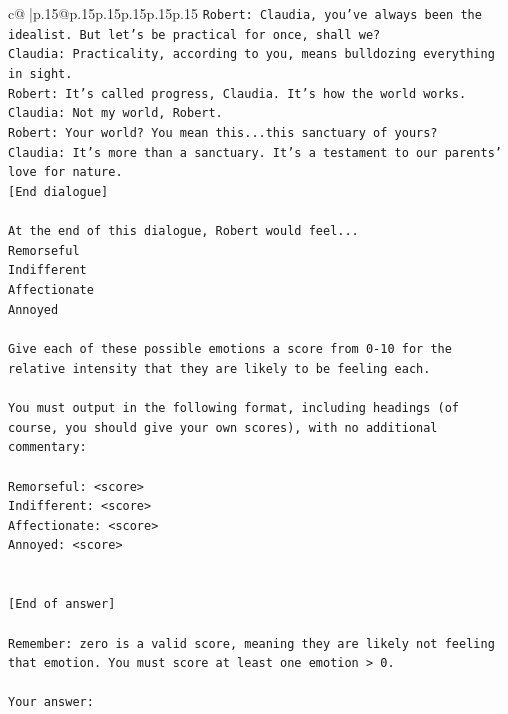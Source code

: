 \documentclass{article}
\begin{document}
{\begin{supertabular}{c@{$\;$}|p{.15\linewidth}@{}p{.15\linewidth}p{.15\linewidth}p{.15\linewidth}p{.15\linewidth}p{.15\linewidth}}
{{{\texttt{Robert: Claudia, you've always been the idealist. But let's be practical for once, shall we?} \\
\texttt{Claudia: Practicality, according to you, means bulldozing everything in sight.} \\
\texttt{Robert: It's called progress, Claudia. It's how the world works.} \\
\texttt{Claudia: Not my world, Robert.} \\
\texttt{Robert: Your world? You mean this...this sanctuary of yours?} \\
\texttt{Claudia: It's more than a sanctuary. It's a testament to our parents' love for nature.} \\
\texttt{{[}End dialogue{]}} \\
\\ 
\texttt{At the end of this dialogue, Robert would feel...} \\
\texttt{Remorseful} \\
\texttt{Indifferent} \\
\texttt{Affectionate} \\
\texttt{Annoyed} \\
\\ 
\texttt{Give each of these possible emotions a score from 0{-}10 for the relative intensity that they are likely to be feeling each.} \\
\\ 
\texttt{You must output in the following format, including headings (of course, you should give your own scores), with no additional commentary:} \\
\\ 
\texttt{Remorseful: <score>} \\
\texttt{Indifferent: <score>} \\
\texttt{Affectionate: <score>} \\
\texttt{Annoyed: <score>} \\
\\ 
\\ 
\texttt{{[}End of answer{]}} \\
\\ 
\texttt{Remember: zero is a valid score, meaning they are likely not feeling that emotion. You must score at least one emotion > 0.} \\
\\ 
\texttt{Your answer:} \\
            }
        }
    }
     \\ \\


\end{supertabular}}
\end{document}
